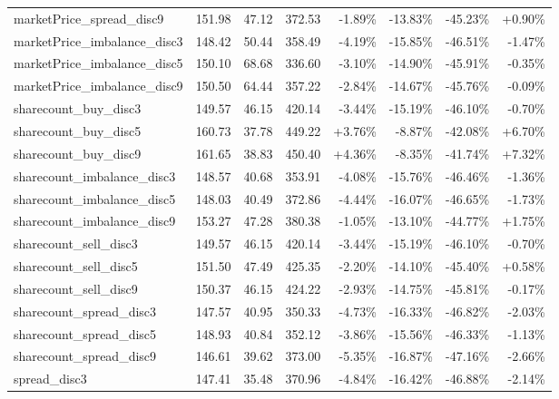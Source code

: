 \begin{table}[ht]
{\begin{tabular}{|lRRR|RRRR|}
marketPrice\_spread\_disc9     &    151.98 &   47.12 &  372.53 &   -1.89\% &  -13.83\% &  -45.23\% &        +0.90\% \\
marketPrice\_imbalance\_disc3      &    148.42 &   50.44 &  358.49 &   -4.19\% &  -15.85\% &  -46.51\% &       -1.47\% \\
marketPrice\_imbalance\_disc5      &    150.10 &   68.68 &  336.60 &   -3.10\% &  -14.90\% &  -45.91\% &       -0.35\% \\
marketPrice\_imbalance\_disc9      &    150.50 &   64.44 &  357.22 &   -2.84\% &  -14.67\% &  -45.76\% &       -0.09\% \\
sharecount\_buy\_disc3         &    149.57 &   46.15 &  420.14 &   -3.44\% &  -15.19\% &  -46.10\% &       -0.70\% \\
sharecount\_buy\_disc5         &    160.73 &   37.78 &  449.22 &    +3.76\% &   -8.87\% &  -42.08\% &        +6.70\% \\
sharecount\_buy\_disc9         &    161.65 &   38.83 &  450.40 &    +4.36\% &   -8.35\% &  -41.74\% &        +7.32\% \\
sharecount\_imbalance\_disc3   &    148.57 &   40.68 &  353.91 &   -4.08\% &  -15.76\% &  -46.46\% &       -1.36\% \\
sharecount\_imbalance\_disc5   &    148.03 &   40.49 &  372.86 &   -4.44\% &  -16.07\% &  -46.65\% &       -1.73\% \\
sharecount\_imbalance\_disc9   &    153.27 &   47.28 &  380.38 &   -1.05\% &  -13.10\% &  -44.77\% &        +1.75\% \\
sharecount\_sell\_disc3        &    149.57 &   46.15 &  420.14 &   -3.44\% &  -15.19\% &  -46.10\% &       -0.70\% \\
sharecount\_sell\_disc5        &    151.50 &   47.49 &  425.35 &   -2.20\% &  -14.10\% &  -45.40\% &        +0.58\% \\
sharecount\_sell\_disc9        &    150.37 &   46.15 &  424.22 &   -2.93\% &  -14.75\% &  -45.81\% &       -0.17\% \\
sharecount\_spread\_disc3      &    147.57 &   40.95 &  350.33 &   -4.73\% &  -16.33\% &  -46.82\% &       -2.03\% \\
sharecount\_spread\_disc5      &    148.93 &   40.84 &  352.12 &   -3.86\% &  -15.56\% &  -46.33\% &       -1.13\% \\
sharecount\_spread\_disc9      &    146.61 &   39.62 &  373.00 &   -5.35\% &  -16.87\% &  -47.16\% &       -2.66\% \\
spread\_disc3                 &    147.41 &   35.48 &  370.96 &   -4.84\% &  -16.42\% &  -46.88\% &       -2.14\% \\

\end{tabular}}
\end{table}

